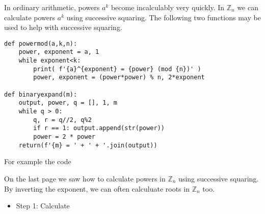 \documentclass[12pt]{exam}
\newcommand{\Z}{\mathbb Z}
\begin{document}
\begin{questions}
  \question In ordinary arithmetic, powers $a^k$ become incalculably very quickly. In $\Z_n$ we can calculate powers $a^k$ using successive squaring. The following two functions may be used to help with successive squaring.
  
  \begin{lstlisting}
def powermod(a,k,n):
    power, exponent = a, 1
    while exponent<k:
        print( f'{a}^{exponent} = {power} (mod {n})' )
        power, exponent = (power*power) % n, 2*exponent

def binaryexpand(m):
    output, power, q = [], 1, m
    while q > 0:
        q, r = q//2, q%2
        if r == 1: output.append(str(power))
        power = 2 * power
    return(f'{m} = ' + ' + '.join(output))
  \end{lstlisting}
  
  For example the code
  \newpage
  \question On the last page we saw how to calculate powers in $\Z_n$ using successive squaring. By inverting the exponent, we can often calculuate roots in $\Z_n$ too.
  \begin{itemize}
    \item Step 1: Calculate
  \end{itemize}
\end{questions}
\end{document}
